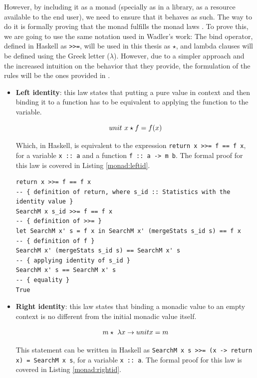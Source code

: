 However, by including it as a monad (specially as in a library, as a resource
available to the end user), we need to ensure that it behaves as such. The way
to do it is formally proving that the monad fulfills the monad laws
\cite{wadler-1993-monad}. To prove this, we are going to use the same notation
used in Wadler's work: The bind operator, defined in Haskell as
\texttt{>>=}, will be used in this thesis as $\star$, and lambda clauses will
be defined using the Greek letter ($\lambda$). However, due to a simpler
approach and the increased intuition on the behavior that they provide, the
formulation of the rules will be the ones provided in
\cite{lipovaca-2011-learn}.

\begin{itemize}
\item \textbf{Left identity}: this law states that putting a pure value in
  context and then binding it to a function has to be equivalent to applying
  the function to the variable.

  $$
  unit \  x \star f = f(x) \\
  $$

  Which, in Haskell, is equivalent to the expression \texttt{return x >>= f ==
    f x}, for a variable \texttt{x :: a} and a function \texttt{f :: a -> m b}.
  The formal proof for this law is covered in Listing \ref{monad:leftid}.

\begin{lstlisting}[style = haskell, caption = Left identity formal proof for
\texttt{SearchM}, label = monad:leftid]
return x >>= f == f x
-- { definition of return, where s_id :: Statistics with the identity value }
SearchM x s_id >>= f == f x
-- { definition of >>= }
let SearchM x' s = f x in SearchM x' (mergeStats s_id s) == f x
-- { definition of f }
SearchM x' (mergeStats s_id s) == SearchM x' s
-- { applying identity of s_id }
SearchM x' s == SearchM x' s
-- { equality }
True
\end{lstlisting}

\item \textbf{Right identity}: this law states that binding a monadic value to
  an empty context is no different from the initial monadic value itself.

  $$
  m \star \  \lambda x \rightarrow unit x = m \\
  $$

  This statement can be written in Haskell as
  \texttt{SearchM x s >>= (x -> return x) = SearchM x s}, for a variable
  \texttt{x :: a}. The formal proof for this law is covered in Listing
  \ref{monad:rightid}.


\end{itemize}
